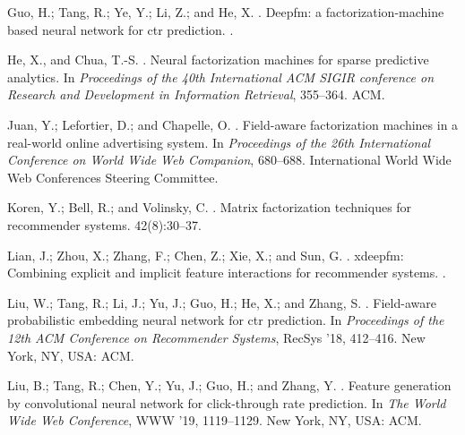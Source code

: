 \documentclass[sigconf]{acmart}
\begin{document}
\begin{thebibliography}{10}
Guo, H.; Tang, R.; Ye, Y.; Li, Z.; and He, X.
.
\newblock Deepfm: a factorization-machine based neural network for ctr
  prediction.
.

He, X., and Chua, T.-S.
.
\newblock Neural factorization machines for sparse predictive analytics.
\newblock In {\em Proceedings of the 40th International ACM SIGIR conference on
  Research and Development in Information Retrieval},  355--364.
\newblock ACM.

Juan, Y.; Lefortier, D.; and Chapelle, O.
.
\newblock Field-aware factorization machines in a real-world online advertising
  system.
\newblock In {\em Proceedings of the 26th International Conference on World
  Wide Web Companion},  680--688.
\newblock International World Wide Web Conferences Steering Committee.

Koren, Y.; Bell, R.; and Volinsky, C.
.
\newblock Matrix factorization techniques for recommender systems.
 42(8):30--37.

Lian, J.; Zhou, X.; Zhang, F.; Chen, Z.; Xie, X.; and Sun, G.
.
\newblock xdeepfm: Combining explicit and implicit feature interactions for
  recommender systems.
.

Liu, W.; Tang, R.; Li, J.; Yu, J.; Guo, H.; He, X.; and Zhang, S.
.
\newblock Field-aware probabilistic embedding neural network for ctr
  prediction.
\newblock In {\em Proceedings of the 12th ACM Conference on Recommender
  Systems}, RecSys '18,  412--416.
\newblock New York, NY, USA: ACM.

Liu, B.; Tang, R.; Chen, Y.; Yu, J.; Guo, H.; and Zhang, Y.
.
\newblock Feature generation by convolutional neural network for click-through
  rate prediction.
\newblock In {\em The World Wide Web Conference}, WWW '19,  1119--1129.
\newblock New York, NY, USA: ACM.


\end{thebibliography}
\end{document}
